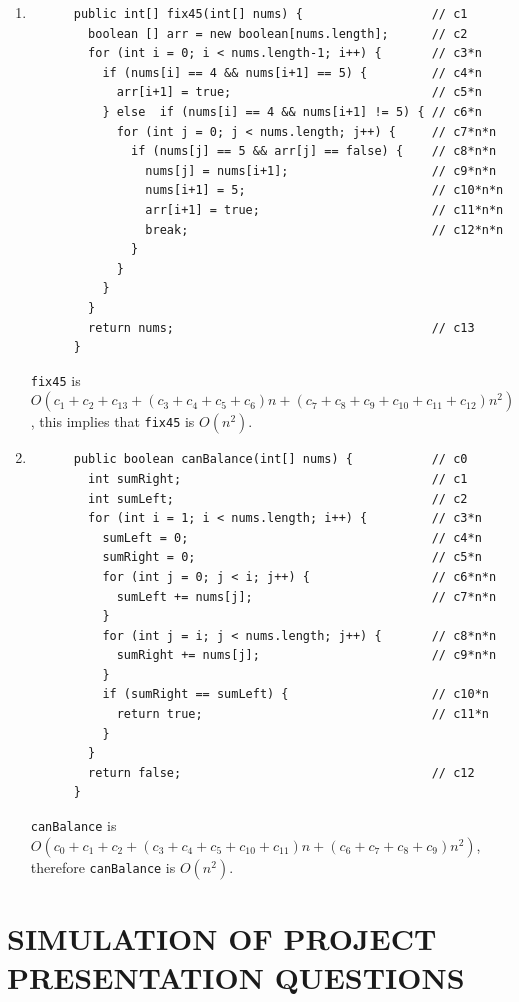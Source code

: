 \documentclass[a4paper,12pt]{article}
\begin{document}
\begin{enumerate}
      \item \begin{Verbatim}
      public int[] fix45(int[] nums) {                  // c1
        boolean [] arr = new boolean[nums.length];      // c2
        for (int i = 0; i < nums.length-1; i++) {       // c3*n
          if (nums[i] == 4 && nums[i+1] == 5) {         // c4*n
            arr[i+1] = true;                            // c5*n
          } else  if (nums[i] == 4 && nums[i+1] != 5) { // c6*n
            for (int j = 0; j < nums.length; j++) {     // c7*n*n
              if (nums[j] == 5 && arr[j] == false) {    // c8*n*n
                nums[j] = nums[i+1];                    // c9*n*n
                nums[i+1] = 5;                          // c10*n*n
                arr[i+1] = true;                        // c11*n*n
                break;                                  // c12*n*n
              }
            }
          }
        }
        return nums;                                    // c13
      }
      \end{Verbatim}
      \texttt{fix45} is $O(c_1+c_2+c_13+(c_3+c_4+c_5+c_6)n+(c_7+c_8+c_9+c_10+c_11+c_12)n^2)$,
      this implies that \texttt{fix45} is $O(n^2)$.
      \item \begin{Verbatim}
      public boolean canBalance(int[] nums) {           // c0
        int sumRight;                                   // c1
        int sumLeft;                                    // c2
        for (int i = 1; i < nums.length; i++) {         // c3*n
          sumLeft = 0;                                  // c4*n
          sumRight = 0;                                 // c5*n
          for (int j = 0; j < i; j++) {                 // c6*n*n
            sumLeft += nums[j];                         // c7*n*n
          }
          for (int j = i; j < nums.length; j++) {       // c8*n*n
            sumRight += nums[j];                        // c9*n*n
          }
          if (sumRight == sumLeft) {                    // c10*n
            return true;                                // c11*n
          }
        }
        return false;                                   // c12
      }
      \end{Verbatim}
      \texttt{canBalance} is $O(c_0+c_1+c_2+(c_3+c_4+c_5+c_10+c_11)n+(c_6+c_7+c_8+c_9)n^2)$,
      therefore \texttt{canBalance} is $O(n^2)$.
    \end{enumerate}


    \section{SIMULATION OF PROJECT PRESENTATION QUESTIONS}
\end{document}
